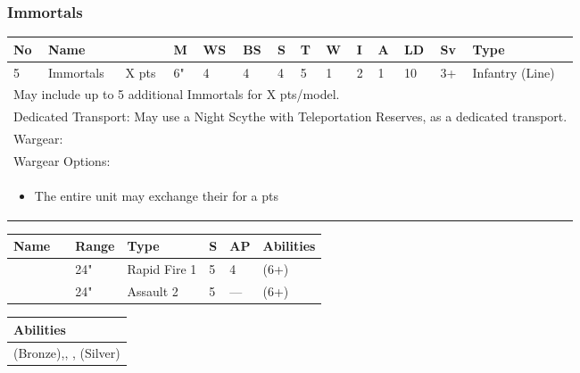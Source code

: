 \newpage
\subsubsection{Immortals}

\noindent
\begin{tabular}{||m{10pt} m{95pt} m{30pt} m{11pt} m{11pt} m{11pt} m{11pt} m{11pt} m{11pt} m{11pt} m{11pt} m{11pt} m{11pt} m{125pt}||}
	\hline
	No & Name & & M & WS & BS & S & T & W & I & A & LD & Sv & Type \\
	\hline
	5 & Immortals & X pts & 6" & 4 & 4 & 4 & 5 & 1 & 2 & 1 & 10 & 3+ & Infantry (Line)\\
	\hline
	\hline
	\multicolumn{14}{||Z{532 pt}||}{May include up to 5 additional Immortals for X pts/model.}\\	
	\multicolumn{14}{||Z{532 pt}||}{Dedicated Transport: May use a Night Scythe with Teleportation Reserves, as a dedicated transport.}\\	
	\hline
	\hline
	\multicolumn{14}{||Z{532 pt}||}{Wargear: \quickref{Gauss Blaster}}\\
	\multicolumn{14}{||Z{532 pt}||}{Wargear Options:} \\	\multicolumn{14}{||Z{532 pt}||}{\begin{itemize}
			\item The entire unit may exchange their \quickref{Gauss Blaster} for a \quickref{Tesla Carbine} \hrulefill 0 pts
	\end{itemize}} \\
	\hline
\end{tabular}

\noindent
\begin{tabular}{||m{110pt} m{30pt} m{31pt} m{55pt} m{12pt} m{12pt} m{210pt}||}
	\hline
	Name & & Range & Type & S & AP & Abilities \\
	\hline
	\quickref{Gauss Blaster} & & 24" & Rapid Fire 1 & 5 & 4 & \quickref{Gauss} (6+) \\
	\quickref{Tesla Carbine} & & 24" & Assault 2 & 5 & — & \quickref{Tesla} (6+) \\
	\hline
\end{tabular}

\noindent
\begin{tabular}{||m{532pt}||}
	\hline
	Abilities \\
	\hline
	\quickref{Awakening Protocols} (Bronze),\quickref{Living Metal}, \quickref{Reanimation Protocols}, \quickref{Soulless Hordes} (Silver) \\
	\hline
\end{tabular}